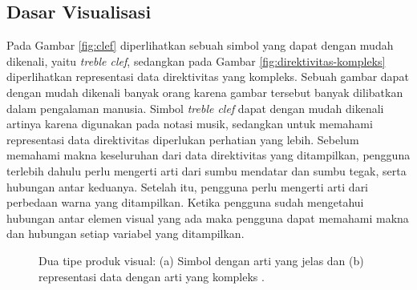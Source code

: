 \subsection{Dasar Visualisasi}
Pada Gambar \ref{fig:clef} diperlihatkan sebuah simbol yang dapat dengan mudah dikenali, yaitu \textit{treble clef}, sedangkan pada Gambar \ref{fig:direktivitas-kompleks} diperlihatkan representasi data direktivitas \bundengan yang kompleks. Sebuah gambar dapat dengan mudah dikenali banyak orang karena gambar tersebut banyak dilibatkan dalam pengalaman manusia. Simbol \textit{treble clef} dapat dengan mudah dikenali artinya karena digunakan pada notasi musik, sedangkan untuk memahami representasi data direktivitas \bundengan diperlukan perhatian yang lebih. Sebelum memahami makna keseluruhan dari data direktivitas yang ditampilkan, pengguna terlebih dahulu perlu mengerti arti dari sumbu mendatar dan sumbu tegak, serta hubungan antar keduanya. Setelah itu, pengguna perlu mengerti arti dari perbedaan warna yang ditampilkan. Ketika pengguna sudah mengetahui hubungan antar elemen visual yang ada maka pengguna dapat memahami makna dan hubungan setiap variabel yang ditampilkan. \par
\begin{figure}[t!]
    \centering
    \hspace{1cm}
    \caption{Dua tipe produk visual: (a) Simbol dengan arti yang jelas \cite{bukuTeoriMusik} dan (b) representasi data dengan arti yang kompleks \cite{prosidingDirektivitas}.}
\end{figure}
